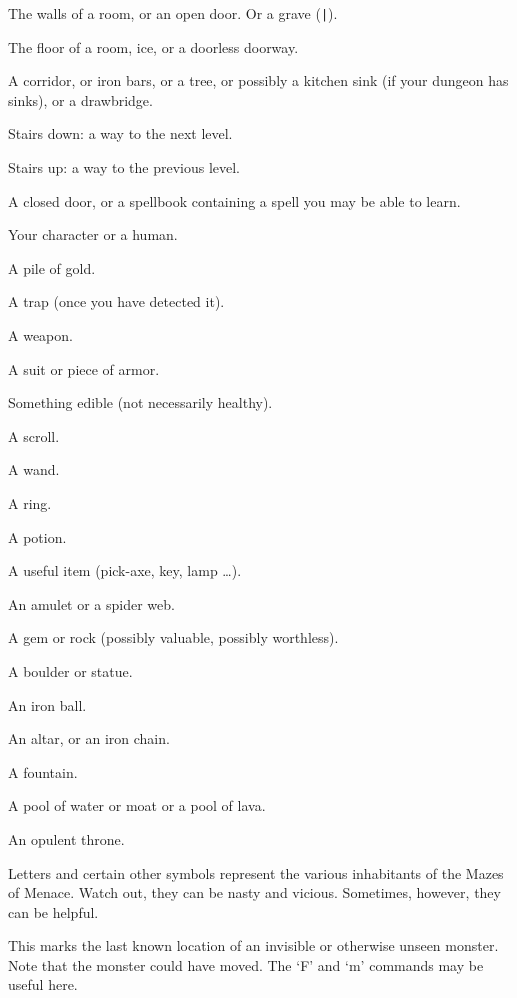\blist{}
\item[\tb{- {\rm and} |}]
The walls of a room, or an open door.  Or a grave ({\tt |}).
\item[\tb{.}]
The floor of a room, ice, or a doorless doorway.
\item[\tb{\#}]
A corridor, or iron bars, or a tree, or possibly a kitchen sink (if
your dungeon has sinks), or a drawbridge.
\item[\tb{>}]
Stairs down: a way to the next level.
\item[\tb{<}]
Stairs up: a way to the previous level.
\item[\tb{+}]
A closed door, or a spellbook containing a spell you may be able to learn.
\item[\tb{@}]
Your character or a human.
\item[\tb{\$}]
A pile of gold.
\item[\tb{\^}]
A trap (once you have detected it).
\item[\tb{)}]
A weapon.
\item[\tb{[}]
A suit or piece of armor.
\item[\tb{\%}]
Something edible (not necessarily healthy).
\item[\tb{?}]
A scroll.
\item[\tb{/}]
A wand.
\item[\tb{=}]
A ring.
\item[\tb{!}]
A potion.
\item[\tb{(}]
A useful item (pick-axe, key, lamp \ldots).
\item[\tb{"}]
An amulet or a spider web.
\item[\tb{*}]
A gem or rock (possibly valuable, possibly worthless).
\item[\tb{`}]
A boulder or statue.
\item[\tb{0}]
An iron ball.
\item[\tb{_}]
An altar, or an iron chain.
\item[\tb{\{}]
A fountain.
\item[\tb{\}}]
A pool of water or moat or a pool of lava.
\item[\tb{$\backslash$}]
An opulent throne.
\item[\tb{a-zA-Z {\rm \& other symbols}}]
Letters and certain other symbols represent the various inhabitants
of the Mazes of Menace.  Watch out, they can be nasty and vicious.
Sometimes, however, they can be helpful.
\item[\tb{I}]
This marks the last known location of an invisible or otherwise unseen
monster.  Note that the monster could have moved.  The `F' and `m' commands
may be useful here.

